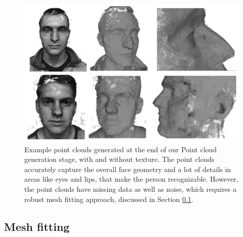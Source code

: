\documentclass[10pt,twocolumn,letterpaper]{article}
\begin{document}
\begin{figure}[t]
\begin{center}
   \includegraphics[width=0.95\linewidth]{images/point_clouds_sample.png}
\end{center}
   \caption{Example point clouds generated at the end of our Point cloud generation stage, with and without texture. The point clouds accurately capture the overall face geometry and a lot of details in areas like eyes and lips, that make the person recognizable. However, the point clouds have missing data as well as noise, which requires a robust mesh fitting approach, discussed in Section \ref{sec:mesh_fit}.  }
\label{fig:pcl_sample}
\end{figure}

\subsection{Mesh fitting} \label{sec:mesh_fit}
\end{document}
